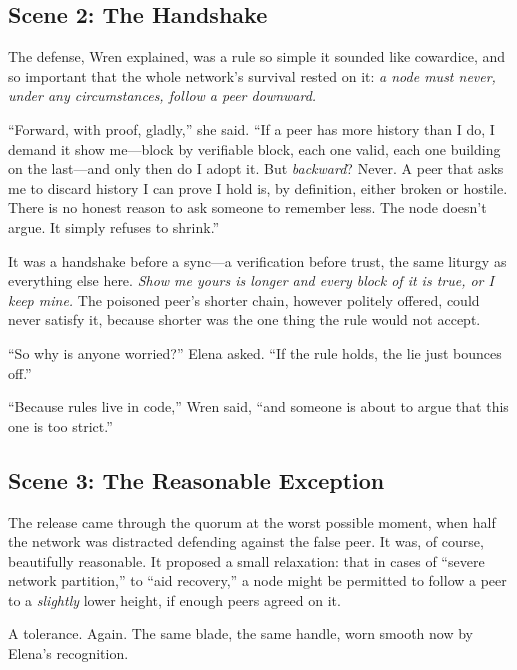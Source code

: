 \hypertarget{scene-2-the-handshake}{%
\subsection{Scene 2: The
Handshake}\label{scene-2-the-handshake}}

The defense, Wren explained, was a rule so simple it sounded like cowardice, and
so important that the whole network's survival rested on it: \emph{a node must
never, under any circumstances, follow a peer downward.}

``Forward, with proof, gladly,'' she said. ``If a peer has more history than I do,
I demand it show me---block by verifiable block, each one valid, each one building
on the last---and only then do I adopt it. But \emph{backward}? Never. A peer that
asks me to discard history I can prove I hold is, by definition, either broken or
hostile. There is no honest reason to ask someone to remember less. The node
doesn't argue. It simply refuses to shrink.''

It was a handshake before a sync---a verification before trust, the same liturgy
as everything else here. \emph{Show me yours is longer and every block of it is
true, or I keep mine.} The poisoned peer's shorter chain, however politely
offered, could never satisfy it, because shorter was the one thing the rule would
not accept.

``So why is anyone worried?'' Elena asked. ``If the rule holds, the lie just
bounces off.''

``Because rules live in code,'' Wren said, ``and someone is about to argue that
this one is too strict.''

\hypertarget{scene-3-the-reasonable-exception}{%
\subsection{Scene 3: The Reasonable
Exception}\label{scene-3-the-reasonable-exception}}

The release came through the quorum at the worst possible moment, when half the
network was distracted defending against the false peer. It was, of course,
beautifully reasonable. It proposed a small relaxation: that in cases of
``severe network partition,'' to ``aid recovery,'' a node might be permitted to
follow a peer to a \emph{slightly} lower height, if enough peers agreed on it.

A tolerance. Again. The same blade, the same handle, worn smooth now by Elena's
recognition.

